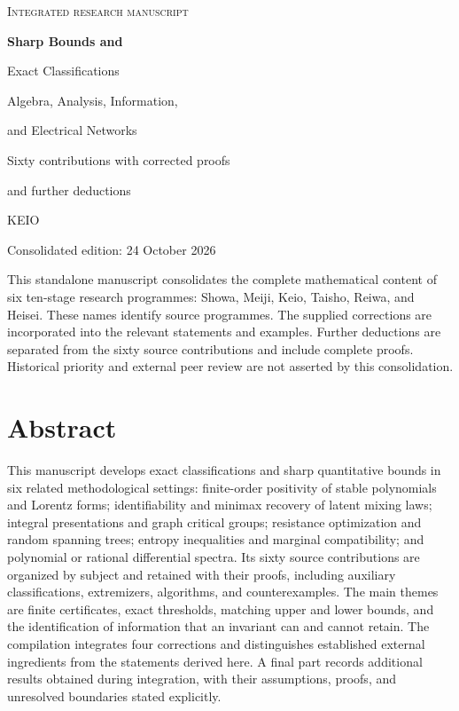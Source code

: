 \documentclass[11pt,a4paper]{article}
\theoremstyle{definition}\newtheorem{definition}[theorem]{Definition}
\theoremstyle{remark}\newtheorem{remark}[theorem]{Remark}
\numberwithin{equation}{section}
\begin{document}
\hypersetup{pageanchor=false}
\begin{titlepage}
\centering
\vspace*{20mm}
{\small\scshape Integrated research manuscript\par}
\vspace{12mm}
{\Huge\bfseries Sharp Bounds and\par Exact Classifications\par}
\vspace{9mm}
{\Large Algebra, Analysis, Information,\par and Electrical Networks\par}
\vspace{12mm}
{\large Sixty contributions with corrected proofs\par and further deductions\par}
\vspace{15mm}
{\Large KEIO\par}
\vspace{4mm}
{\normalsize Consolidated edition: 24 October 2026\par}
\vfill
\begin{minipage}{0.86\textwidth}\small
This standalone manuscript consolidates the complete mathematical content of six ten-stage research programmes: Showa, Meiji, Keio, Taisho, Reiwa, and Heisei. These names identify source programmes. The supplied corrections are incorporated into the relevant statements and examples. Further deductions are separated from the sixty source contributions and include complete proofs. Historical priority and external peer review are not asserted by this consolidation.
\end{minipage}
\vspace{10mm}
\end{titlepage}
\hypersetup{pageanchor=true}
\section*{Abstract}
This manuscript develops exact classifications and sharp quantitative bounds in six related methodological settings: finite-order positivity of stable polynomials and Lorentz forms; identifiability and minimax recovery of latent mixing laws; integral presentations and graph critical groups; resistance optimization and random spanning trees; entropy inequalities and marginal compatibility; and polynomial or rational differential spectra. Its sixty source contributions are organized by subject and retained with their proofs, including auxiliary classifications, extremizers, algorithms, and counterexamples. The main themes are finite certificates, exact thresholds, matching upper and lower bounds, and the identification of information that an invariant can and cannot retain. The compilation integrates four corrections and distinguishes established external ingredients from the statements derived here. A final part records additional results obtained during integration, with their assumptions, proofs, and unresolved boundaries stated explicitly.
\end{document}
